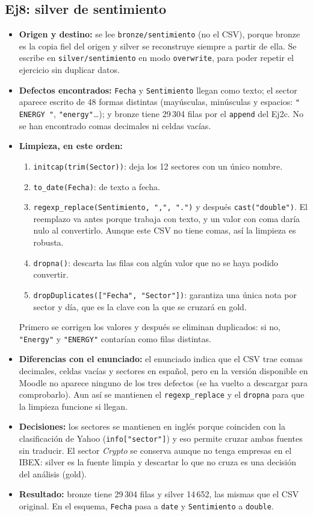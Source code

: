 \documentclass[11pt,a4paper]{article}
\newcommand{\code}[1]{\texttt{#1}}
\begin{document}
\subsection*{Ej8: silver de sentimiento}
\begin{itemize}
    \item \textbf{Origen y destino:} se lee \code{bronze/sentimiento} (no el CSV), porque bronze es la copia fiel del origen y silver se reconstruye siempre a partir de ella. Se escribe en \code{silver/sentimiento} en modo \code{overwrite}, para poder repetir el ejercicio sin duplicar datos.
    \item \textbf{Defectos encontrados:} \code{Fecha} y \code{Sentimiento} llegan como texto; el sector aparece escrito de 48 formas distintas (mayúsculas, minúsculas y espacios: \code{"  ENERGY "}, \code{"energy"}\ldots); y bronze tiene 29\,304 filas por el \code{append} del Ej2c. No se han encontrado comas decimales ni celdas vacías.
    \item \textbf{Limpieza, en este orden:}
    \begin{enumerate}
        \item \code{initcap(trim(Sector))}: deja los 12 sectores con un único nombre.
        \item \code{to\_date(Fecha)}: de texto a fecha.
        \item \code{regexp\_replace(Sentimiento, ",", ".")} y después \code{cast("double")}. El reemplazo va antes porque trabaja con texto, y un valor con coma daría nulo al convertirlo. Aunque este CSV no tiene comas, así la limpieza es robusta.
        \item \code{dropna()}: descarta las filas con algún valor que no se haya podido convertir.
        \item \code{dropDuplicates(["Fecha", "Sector"])}: garantiza una única nota por sector y día, que es la clave con la que se cruzará en gold.
    \end{enumerate}
    Primero se corrigen los valores y después se eliminan duplicados: si no, \code{"Energy"} y \code{"ENERGY"} contarían como filas distintas.
    \item \textbf{Diferencias con el enunciado:} el enunciado indica que el CSV trae comas decimales, celdas vacías y sectores en español, pero en la versión disponible en Moodle no aparece ninguno de los tres defectos (se ha vuelto a descargar para comprobarlo). Aun así se mantienen el \code{regexp\_replace} y el \code{dropna} para que la limpieza funcione si llegan.
    \item \textbf{Decisiones:} los sectores se mantienen en inglés porque coinciden con la clasificación de Yahoo (\code{info["sector"]}) y eso permite cruzar ambas fuentes sin traducir. El sector \textit{Crypto} se conserva aunque no tenga empresas en el IBEX: silver es la fuente limpia y descartar lo que no cruza es una decisión del análisis (gold).
    \item \textbf{Resultado:} bronze tiene 29\,304 filas y silver 14\,652, las mismas que el CSV original. En el esquema, \code{Fecha} pasa a \code{date} y \code{Sentimiento} a \code{double}.
\end{itemize}
\end{document}
